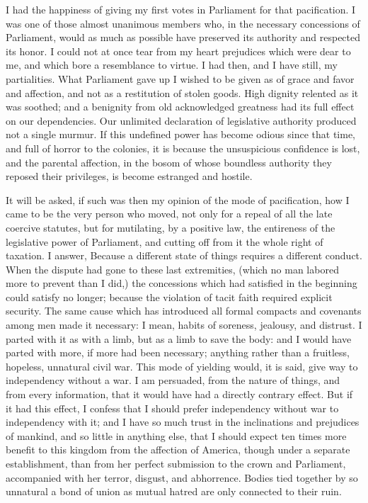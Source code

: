I had the happiness of giving my first votes in Parliament for that pacification. I was one of those almost unanimous members who, in the necessary concessions of Parliament, would as much as possible have preserved its authority and respected its honor. I could not at once tear from my heart prejudices which were dear to me, and which bore a resemblance to virtue. I had then, and I have still, my partialities. What Parliament gave up I wished to be given as of grace and favor and affection, and not as a restitution of stolen goods. High dignity relented as it was soothed; and a benignity from old acknowledged greatness had its full effect on our dependencies. Our unlimited declaration of legislative authority produced not a single murmur. If this undefined power has become odious since that time, and full of horror to the colonies, it is because the unsuspicious confidence is lost, and the parental affection, in the bosom of whose boundless authority they reposed their privileges, is become estranged and hostile.

It will be asked, if such was then my opinion of the mode of pacification, how I came to be the very person who moved, not only for a repeal of all the late coercive statutes, but for mutilating, by a positive law, the entireness of the legislative power of Parliament, and cutting off from it the whole right of taxation. I answer, Because a different state of things requires a different conduct. When the dispute had gone to these last extremities, (which no man labored more to prevent than I did,) the concessions which had satisfied in the beginning could satisfy no longer; because the violation of tacit faith required explicit security. The same cause which has introduced all formal compacts and covenants among men made it necessary: I mean, habits of soreness, jealousy, and distrust. I parted with it as with a limb, but as a limb to save the body: and I would have parted with more, if more had been necessary; anything rather than a fruitless, hopeless, unnatural civil war. This mode of yielding would, it is said, give way to independency without a war. I am persuaded, from the nature of things, and from every information, that it would have had a directly contrary effect. But if it had this effect, I confess that I should prefer independency without war to independency with it; and I have so much trust in the inclinations and prejudices of mankind, and so little in anything else, that I should expect ten times more benefit to this kingdom from the affection of America, though under a separate establishment, than from her perfect submission to the crown and Parliament, accompanied with her terror, disgust, and abhorrence. Bodies tied together by so unnatural a bond of union as mutual hatred are only connected to their ruin.

